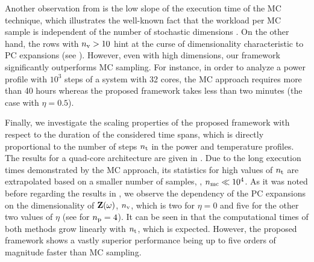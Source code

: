
Another observation from  is the low slope of the execution time of the MC technique, which illustrates the well-known fact that the workload per MC sample is independent of the number of stochastic dimensions \cite{maitre2010}.
On the other hand, the rows with ${n_\text{v}} > 10$ hint at the curse of dimensionality characteristic to PC expansions (see ).
However, even with high dimensions, our framework significantly outperforms MC sampling. For instance, in order to analyze a power profile with $10^3$ steps of a system with 32 cores, the MC approach requires more than 40 hours whereas the proposed framework takes less than two minutes (the case with $\eta = 0.5$).

Finally, we investigate the scaling properties of the proposed framework with respect to the duration of the considered time spans, which is directly proportional to the number of steps ${n_\text{t}}$ in the power and temperature profiles.
The results for a quad-core architecture are given in .
Due to the long execution times demonstrated by the MC approach, its statistics for high values of ${n_\text{t}}$ are extrapolated based on a smaller number of samples, \ie, ${n_\text{mc}} \ll 10^4$.
As it was noted before regarding the results in , we observe the dependency of the PC expansions on the dimensionality of $\mathbf{Z}(\omega)$, ${n_\text{v}}$, which is two for $\eta = 0$ and five for the other two values of $\eta$ (see  for ${n_\text{p}} = 4$).
It can be seen in  that the computational times of both methods grow linearly with ${n_\text{t}}$, which is expected.
However, the proposed framework shows a vastly superior performance being up to five orders of magnitude faster than MC sampling.
